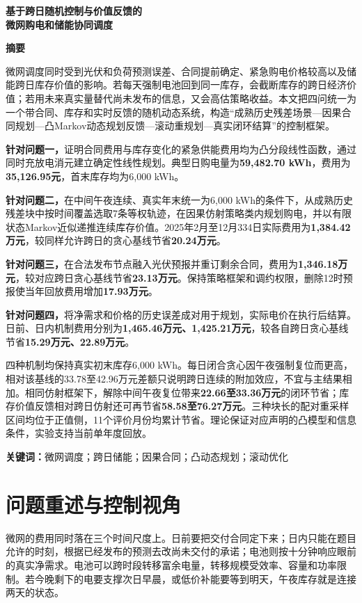 \documentclass[UTF8,a4paper,zihao=-4,fontset=mac]{ctexart}
\begin{document}
\pagestyle{plain}
\thispagestyle{plain}
\begin{center}
{\LARGE\bfseries 基于跨日随机控制与价值反馈的\\微网购电和储能协同调度}\par\vspace{1em}
{\large\bfseries 摘\quad 要}
\end{center}
微网调度同时受到光伏和负荷预测误差、合同提前确定、紧急购电价格较高以及储能跨日库存价值的影响。若每天强制电池回到同一库存，会截断库存的跨日经济价值；若用未来真实量替代尚未发布的信息，又会高估策略收益。本文把四问统一为一个带合同、库存和实时反馈的随机动态系统，构造“成熟历史残差场景—因果合同规划—凸Markov动态规划反馈—滚动重规划—真实闭环结算”的控制框架。

\textbf{针对问题一，}证明合同费用与库存变化的紧急供能费用均为凸分段线性函数，通过同时充放电消元建立确定性线性规划。典型日购电量为\textbf{59,482.70 kWh}，费用为\textbf{35,126.95元}，首末库存均为6,000 kWh。

\textbf{针对问题二，}在中间午夜连续、真实年末统一为6,000 kWh的条件下，从成熟历史残差块中按时间覆盖选取7条等权轨迹，在因果仿射策略类内规划购电，并以有限状态Markov近似递推连续库存价值。2025年2月至12月334日实际费用为\textbf{1,384.42万元}，较同样允许跨日的贪心基线节省\textbf{20.24万元}。

\textbf{针对问题三，}在合法发布节点融入光伏预报并重订剩余合同，费用为\textbf{1,346.18万元}，较对应跨日贪心基线节省\textbf{23.13万元}。保持策略框架和调约权限，删除12时预报使当年回放费用增加\textbf{17.93万元}。

\textbf{针对问题四，}将净需求和价格的历史误差成对用于规划，实际电价在执行后结算。日前、日内机制费用分别为\textbf{1,465.46万元、1,425.21万元}，较各自跨日贪心基线节省\textbf{15.29万元、22.89万元}。

四种机制均保持真实初末库存6,000 kWh。每日闭合贪心因午夜强制复位而更高，相对该基线的33.78至42.96万元差额只说明跨日连续的附加效应，不宜与主结果相加。相同仿射框架下，解除中间午夜复位带来\textbf{22.66至33.36万元}的闭环节省；库存价值反馈相对跨日仿射还可再节省\textbf{58.58至76.27万元}。三种块长的配对重采样区间均位于正值侧，11个评价月份均累计节省。理论保证对应声明的凸模型和信息条件，实验支持当前单年度回放。

\noindent\textbf{关键词：}微网调度；跨日储能；因果合同；凸动态规划；滚动优化
\clearpage
\section{问题重述与控制视角}
微网的费用同时落在三个时间尺度上。日前要把交付合同定下来；日内只能在题目允许的时刻，根据已经发布的预测去改尚未交付的承诺；电池则按十分钟响应眼前的真实净需求。电池可以跨时段转移富余电量，转移规模受效率、容量和功率限制。若今晚剩下的电要支撑次日早晨，或低价补能要等到明天，午夜库存就是连接两天的状态。
\end{document}
